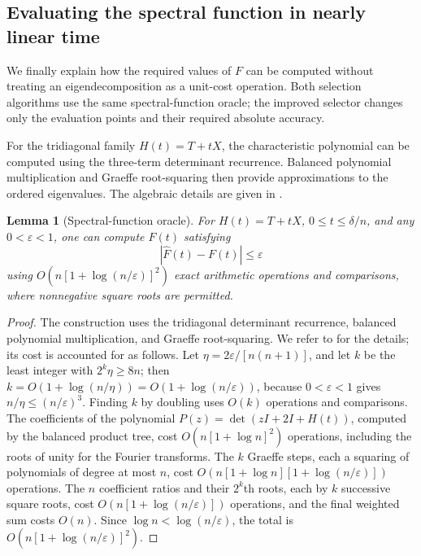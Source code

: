 \documentclass[10pt,a4paper]{article}
\newtheorem{lemma}{Lemma}[section]
\begin{document}
\subsection{Evaluating the spectral function in nearly linear time}
\label{subsec:oracle}

We finally explain how the required values of $F$
can be computed without treating an eigendecomposition
as a unit-cost operation. Both selection algorithms
use the same spectral-function oracle; the improved
selector changes only the evaluation points and
their required absolute accuracy.

For the tridiagonal family $H(t)=T+tX$, the
characteristic polynomial can be computed using
the three-term determinant recurrence.
Balanced polynomial multiplication and Graeffe
root-squaring then provide approximations to
the ordered eigenvalues. The algebraic details
are given in .

\begin{lemma}[Spectral-function oracle]
\label{lem:oracle}
For $H(t)=T+tX$, $0\leq t\leq\delta/n$,
and any $0<\varepsilon<1$, one can compute
$\widehat F(t)$ satisfying
\begin{equation}\label{eq:oracle}
\boxed{
|\widehat F(t)-F(t)|\leq\varepsilon
}
\end{equation}
using
$O(n[1+\log(n/\varepsilon)]^2)$
exact arithmetic operations and comparisons,
where nonnegative square roots are permitted.
\end{lemma}

\begin{proof}
The construction uses the tridiagonal determinant
recurrence, balanced polynomial multiplication,
and Graeffe root-squaring. We refer to
 for the details; its cost is
accounted for as follows. Let
$\eta=2\varepsilon/[n(n+1)]$, and let $k$ be the least
integer with $2^k\eta\geq8n$; then
$k=O(1+\log(n/\eta))=O(1+\log(n/\varepsilon))$, because
$0<\varepsilon<1$ gives $n/\eta\leq(n/\varepsilon)^3$.
Finding $k$ by doubling uses $O(k)$ operations and
comparisons. The coefficients of the polynomial
$P(z)=\det(zI+2I+H(t))$, computed by the balanced product
tree, cost
$O(n[1+\log n]^2)$ operations, including the roots of
unity for the Fourier transforms. The $k$ Graeffe steps,
each a squaring of polynomials of degree at most $n$, cost
$O(n[1+\log n][1+\log(n/\varepsilon)])$ operations. The
$n$ coefficient ratios and their $2^k$th roots, each by
$k$ successive square roots, cost
$O(n[1+\log(n/\varepsilon)])$ operations, and the final
weighted sum costs $O(n)$. Since $\log n<\log(n/\varepsilon)$,
the total is $O(n[1+\log(n/\varepsilon)]^2)$.
\end{proof}
\end{document}
